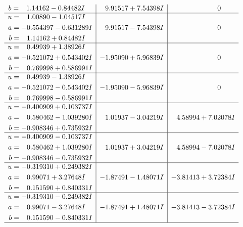 \documentclass[1p]{elsarticle_modified}
\theoremstyle{definition}
\begin{document}
$$\begin{array}{c|c|c}
\begin{aligned}
b &= \phantom{-}1.14162 - 0.84482 I\end{aligned}
 & \phantom{-}9.91517 + 7.54398 I & \phantom{-0.000000 } 0 \\ \hline\begin{aligned}
u &= \phantom{-}1.00890 - 1.04517 I \\
a &= -0.554397 - 0.631289 I \\
b &= \phantom{-}1.14162 + 0.84482 I\end{aligned}
 & \phantom{-}9.91517 - 7.54398 I & \phantom{-0.000000 } 0 \\ \hline\begin{aligned}
u &= \phantom{-}0.49939 + 1.38926 I \\
a &= -0.521072 + 0.543402 I \\
b &= \phantom{-}0.769998 + 0.586991 I\end{aligned}
 & -1.95090 + 5.96839 I & \phantom{-0.000000 } 0 \\ \hline\begin{aligned}
u &= \phantom{-}0.49939 - 1.38926 I \\
a &= -0.521072 - 0.543402 I \\
b &= \phantom{-}0.769998 - 0.586991 I\end{aligned}
 & -1.95090 - 5.96839 I & \phantom{-0.000000 } 0 \\ \hline\begin{aligned}
u &= -0.400909 + 0.103737 I \\
a &= \phantom{-}0.580462 - 1.039280 I \\
b &= -0.908346 + 0.735932 I\end{aligned}
 & \phantom{-}1.01937 - 3.04219 I & \phantom{-}4.58994 + 7.02078 I \\ \hline\begin{aligned}
u &= -0.400909 - 0.103737 I \\
a &= \phantom{-}0.580462 + 1.039280 I \\
b &= -0.908346 - 0.735932 I\end{aligned}
 & \phantom{-}1.01937 + 3.04219 I & \phantom{-}4.58994 - 7.02078 I \\ \hline\begin{aligned}
u &= -0.319310 + 0.249382 I \\
a &= \phantom{-}0.99071 + 3.27648 I \\
b &= \phantom{-}0.151590 + 0.840331 I\end{aligned}
 & -1.87491 - 1.48071 I & -3.81413 + 3.72384 I \\ \hline\begin{aligned}
u &= -0.319310 - 0.249382 I \\
a &= \phantom{-}0.99071 - 3.27648 I \\
b &= \phantom{-}0.151590 - 0.840331 I\end{aligned}
 & -1.87491 + 1.48071 I & -3.81413 - 3.72384 I\\
 \hline 
 \end{array}$$\newpage\newpage\renewcommand{\arraystretch}{1}
\end{document}
